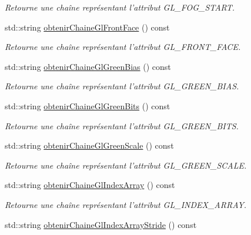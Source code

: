 \begin{DoxyCompactItemize}
\begin{DoxyCompactList}\small\item\em Retourne une chaîne représentant l'attribut G\-L\-\_\-\-F\-O\-G\-\_\-\-S\-T\-A\-R\-T. \end{DoxyCompactList}\item 
std\-::string \hyperlink{group__utilitaire_ga5843f630d530a2112407e19b540e3c42}{obtenir\-Chaine\-Gl\-Front\-Face} () const 
\begin{DoxyCompactList}\small\item\em Retourne une chaîne représentant l'attribut G\-L\-\_\-\-F\-R\-O\-N\-T\-\_\-\-F\-A\-C\-E. \end{DoxyCompactList}\item 
std\-::string \hyperlink{group__utilitaire_gabb435ce9e5ba38406d8c429a5a0510ed}{obtenir\-Chaine\-Gl\-Green\-Bias} () const 
\begin{DoxyCompactList}\small\item\em Retourne une chaîne représentant l'attribut G\-L\-\_\-\-G\-R\-E\-E\-N\-\_\-\-B\-I\-A\-S. \end{DoxyCompactList}\item 
std\-::string \hyperlink{group__utilitaire_ga418e82a0a01a9dfe598780e602b41b2f}{obtenir\-Chaine\-Gl\-Green\-Bits} () const 
\begin{DoxyCompactList}\small\item\em Retourne une chaîne représentant l'attribut G\-L\-\_\-\-G\-R\-E\-E\-N\-\_\-\-B\-I\-T\-S. \end{DoxyCompactList}\item 
std\-::string \hyperlink{group__utilitaire_ga933583938ec361ea302f25dd1323b541}{obtenir\-Chaine\-Gl\-Green\-Scale} () const 
\begin{DoxyCompactList}\small\item\em Retourne une chaîne représentant l'attribut G\-L\-\_\-\-G\-R\-E\-E\-N\-\_\-\-S\-C\-A\-L\-E. \end{DoxyCompactList}\item 
std\-::string \hyperlink{group__utilitaire_ga63a264a046b4714154de9f26b04ab1f8}{obtenir\-Chaine\-Gl\-Index\-Array} () const 
\begin{DoxyCompactList}\small\item\em Retourne une chaîne représentant l'attribut G\-L\-\_\-\-I\-N\-D\-E\-X\-\_\-\-A\-R\-R\-A\-Y. \end{DoxyCompactList}\item 
std\-::string \hyperlink{group__utilitaire_ga79b9f3969a037a0ed02684b41a8a1328}{obtenir\-Chaine\-Gl\-Index\-Array\-Stride} () const 

\end{DoxyCompactItemize}

